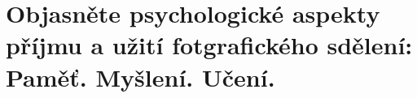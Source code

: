 \section{Objasněte psychologické aspekty příjmu a užití fotgrafického sdělení: Paměť. Myšlení. Učení.}